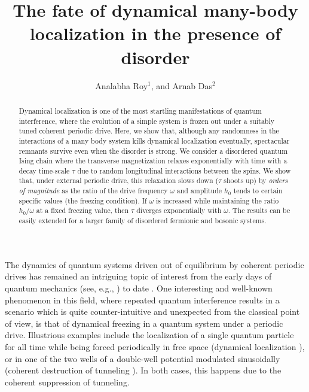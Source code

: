 \documentclass[reprint,preprintnumbers,showpacs,amsmath,twocolumn,showkeys,aps,prl]{revtex4-1}
\begin{document}

\title{The fate of dynamical many-body localization in the presence of disorder}

\author{Analabha Roy$^1$, and Arnab Das$^2$}

\begin{abstract}
Dynamical localization is one of the most startling manifestations of quantum interference, 
where the evolution of a simple system is frozen out under a suitably tuned coherent periodic drive.   
Here, we show that, although any randomness in the interactions of a many body system kills dynamical localization eventually, spectacular remnants survive even when the disorder is strong. We consider a disordered quantum Ising chain where the transverse magnetization relaxes exponentially with time with a decay time-scale $\tau$ due to random longitudinal interactions between the spins. We show that, under external periodic drive, this relaxation slows down ($\tau$ shoots up) by {\it orders of magnitude} as the ratio of the drive frequency $\omega$ and amplitude $h_{0}$ tends to certain specific values (the freezing condition). If $\omega$ is increased while maintaining the ratio $h_0/\omega$ at a fixed freezing value, then $\tau$ diverges exponentially with $\omega.$ The results can be easily extended 
for a larger family of disordered fermionic and bosonic systems. 

\end{abstract}
\maketitle

The dynamics of quantum systems driven out of equilibrium by coherent periodic drives has
remained an intriguing topic of interest from the early days of quantum mechanics (see, e.g., \cite{Sakurai}) 
to date
\cite{Andre-1,Andre-2,AAR-PRL,AAR-Generic,Arimondo-Rev,Gauge-1a,Gauge-1b,Gauge-2,Manisha-Amit-Diptiman-da,
Prosen-1,Bastidas,victor,Sthitadhi,Analabha1,Analabha2,AD-KS-DS-BKC,Kris-Freezing,Ashhab-Nori,Luca-Rigol,Anushya,
Arimondo-1,Arimondo-2,Bloch-Periodic,Shengstock,DMF-IISER-Exp,Kaitzer,Gopar}. 
One interesting and well-known phenomenon in this field, where repeated quantum interference results in a
scenario which is quite counter-intuitive and unexpected from the classical point of view, 
is that of dynamical freezing in a quantum system under a periodic drive.  
Illustrious examples include the localization of a single quantum particle for all time while being forced periodically  
in free space (dynamical localization \cite{Dunlap}), or in one of the two wells of a double-well potential 
modulated sinusoidally (coherent destruction of tunneling \cite{Hanggi}). In both cases, this happens due to the coherent suppression of tunneling. 
\end{document}
